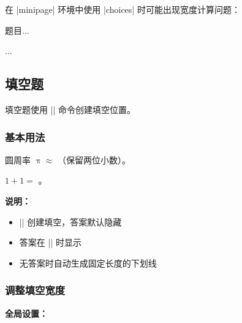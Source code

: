 在 |minipage| 环境中使用 |choices| 时可能出现宽度计算问题：

\begin{latexcode}
  \begin{minipage}{0.5\textwidth}
    \begin{question}
      题目...\paren[A]
      \begin{choices}[columns = 1]  %
        \item ...
      \end{choices}
    \end{question}
  \end{minipage}
\end{latexcode}


\subsection{填空题}

填空题使用 |\fillin| 命令创建填空位置。

\subsubsection{基本用法}

\begin{latexcode}
  \begin{question}
    圆周率 $\uppi \approx$ \fillin[3.14]（保留两位小数）。
  \end{question}

  \begin{question}
    $1 + 1 = $ \fillin[2]。
  \end{question}
\end{latexcode}

\textbf{说明：}
\begin{itemize}
  \item |\fillin[答案]| 创建填空，答案默认隐藏
  \item 答案在 || 时显示
  \item 无答案时自动生成固定长度的下划线
\end{itemize}

\subsubsection{调整填空宽度}

\textbf{全局设置：}

\begin{latexcode}
\end{latexcode}

